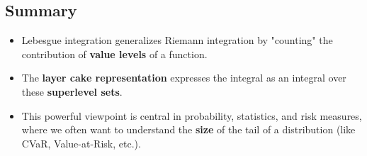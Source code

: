 \documentclass[11pt]{amsart}
\begin{document}
\subsection*{Summary}
\begin{itemize}
	\item Lebesgue integration generalizes Riemann integration by "counting" the contribution of \textbf{value levels} of a function.
	\item The \textbf{layer cake representation} expresses the integral as an integral over these \textbf{superlevel sets}.
	\item This powerful viewpoint is central in probability, statistics, and risk measures, where we often want to understand the \textbf{size} of the tail of a distribution (like CVaR, Value-at-Risk, etc.).
\end{itemize}

\end{document}
